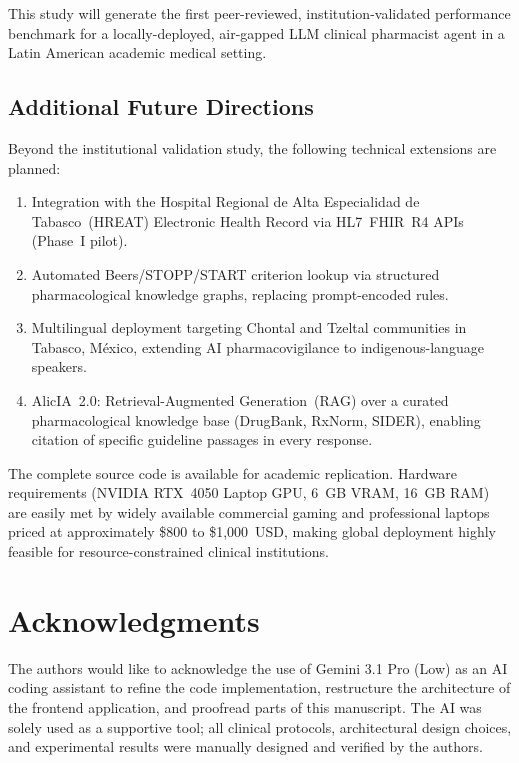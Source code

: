 \documentclass[9pt,conference]{IEEEtran}
\begin{document}
This study will generate the first peer-reviewed, institution-validated
performance benchmark for a locally-deployed, air-gapped LLM clinical
pharmacist agent in a Latin American academic medical setting.

\subsection{Additional Future Directions}

Beyond the institutional validation study, the following technical
extensions are planned:
\begin{enumerate}
  \item Integration with the Hospital Regional de Alta Especialidad de
    Tabasco~(HREAT) Electronic Health Record via HL7~FHIR~R4 APIs (Phase~I pilot).
  \item Automated Beers/STOPP/START criterion lookup via structured
    pharmacological knowledge graphs, replacing prompt-encoded rules.
  \item Multilingual deployment targeting Chontal and Tzeltal communities
    in Tabasco, M\'{e}xico, extending AI pharmacovigilance to indigenous-language
    speakers.
  \item AlicIA~2.0: Retrieval-Augmented Generation~(RAG) over a curated
    pharmacological knowledge base (DrugBank, RxNorm, SIDER), enabling
    citation of specific guideline passages in every response.
\end{enumerate}

The complete source code is available for academic replication. Hardware
requirements (NVIDIA RTX~4050 Laptop GPU, 6~GB VRAM, 16~GB RAM) are easily met 
by widely available commercial gaming and professional laptops priced at 
approximately \$800 to \$1,000~USD, making global deployment highly feasible for 
resource-constrained clinical institutions.

\section*{Acknowledgments}
The authors would like to acknowledge the use of Gemini 3.1 Pro (Low) as an AI coding assistant to refine the code implementation, restructure the architecture of the frontend application, and proofread parts of this manuscript. The AI was solely used as a supportive tool; all clinical protocols, architectural design choices, and experimental results were manually designed and verified by the authors.

\end{document}
